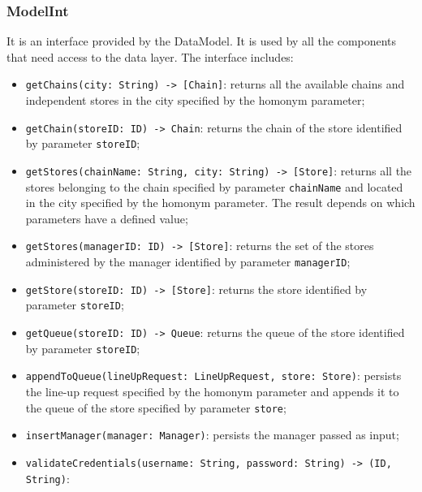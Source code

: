 \documentclass[a4paper,oneside,11pt]{book}
\newcommand{\red}[1]{\begingroup\color{punct}#1\endgroup}
\begin{document}
    \subsubsection{ModelInt}
    It is an interface provided by the DataModel. It is used by all the components that need access to the data layer. The interface includes:
    \begin{itemize}
       \item \texttt{getChains(city: \red{String}) -> [\red{Chain}]}: \newline returns all the available chains and independent stores in the city specified by the homonym parameter;
       \item \texttt{getChain(storeID: \red{ID}) -> \red{Chain}}: \newline 
       returns the chain of the store identified by parameter \texttt{storeID};
       \item \texttt{getStores(chainName: \red{String}, city: \red{String}) -> [\red{Store}]}:\newline
       returns all the stores belonging to the chain specified by parameter \texttt{chainName} and located in the city specified by the homonym parameter. The result depends on which parameters have a defined value;
       \item \texttt{getStores(managerID: \red{ID}) -> [\red{Store}]}: \newline
       returns the set of the stores administered by the manager identified by parameter \texttt{managerID}; 
       \item \texttt{getStore(storeID: \red{ID}) -> [\red{Store}]}: \newline
       returns the store identified by parameter \texttt{storeID};
       \item \texttt{getQueue(storeID: \red{ID}) -> \red{Queue}}: \newline
       returns the queue of the store identified by parameter \texttt{storeID};
       \item \texttt{appendToQueue(lineUpRequest: \red{LineUpRequest}, store: \red{Store})}: \newline
       persists the line-up request specified by the homonym parameter and appends it to the queue of the store specified by parameter \texttt{store};
       \item \texttt{insertManager(manager: \red{Manager})}: \newline
       persists the manager passed as input;
       \item \texttt{validateCredentials(username: \red{String}, password: \red{String}) -> \newline (\red{ID}, \red{String})}: \newline

\end{itemize}
\end{document}

